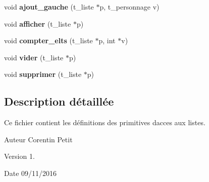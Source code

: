 \begin{DoxyCompactItemize}
\item 
void {\bfseries ajout\+\_\+gauche} (t\+\_\+liste $\ast$p, t\+\_\+personnage v)\hypertarget{a00008_a3c18a559a8adbe1dd9e9bcd49c680c6b}{}\label{a00008_a3c18a559a8adbe1dd9e9bcd49c680c6b}

\item 
void {\bfseries afficher} (t\+\_\+liste $\ast$p)\hypertarget{a00008_a066b4e6b2b8afb789416a06cf18d52b8}{}\label{a00008_a066b4e6b2b8afb789416a06cf18d52b8}

\item 
void {\bfseries compter\+\_\+elts} (t\+\_\+liste $\ast$p, int $\ast$v)\hypertarget{a00008_acea998490ff91e660d2f7d7530a020b7}{}\label{a00008_acea998490ff91e660d2f7d7530a020b7}

\item 
void {\bfseries vider} (t\+\_\+liste $\ast$p)\hypertarget{a00008_a7ecbb44530688750d47fa00a96d6add8}{}\label{a00008_a7ecbb44530688750d47fa00a96d6add8}

\item 
void {\bfseries supprimer} (t\+\_\+liste $\ast$p)\hypertarget{a00008_aab08b37ee056b9411e2265637fb3af1c}{}\label{a00008_aab08b37ee056b9411e2265637fb3af1c}

\end{DoxyCompactItemize}


\subsection{Description détaillée}
Ce fichier contient les définitions des primitives d\textquotesingle{}acces aux listes. 

\begin{DoxyAuthor}{Auteur}
Corentin Petit 
\end{DoxyAuthor}
\begin{DoxyVersion}{Version}
1. 
\end{DoxyVersion}
\begin{DoxyDate}{Date}
09/11/2016 
\end{DoxyDate}
